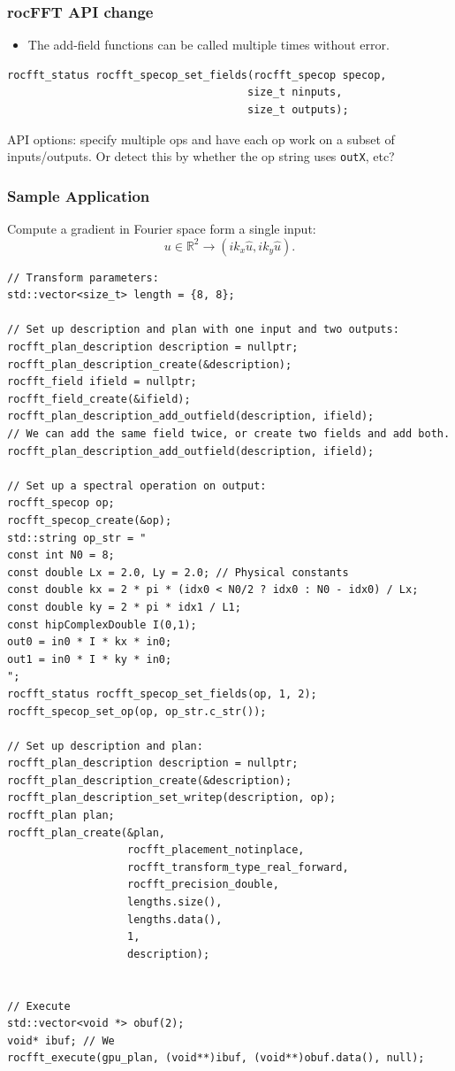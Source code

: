 \documentclass[12pt]{article}
\renewcommand{\(}{\left(}
\renewcommand{\)}{\right)}
\begin{document}
\subsubsection{rocFFT API change}
\begin{itemize}
\item The add-field functions can be called multiple times without error.
\end{itemize}
\begin{lstlisting}
rocfft_status rocfft_specop_set_fields(rocfft_specop specop,
                                      size_t ninputs,
                                      size_t outputs);
\end{lstlisting}
API options: specify multiple ops and have each op work on a subset of
inputs/outputs.  Or detect this by whether the op string uses
\lstinline{outX}, etc?


\subsubsection{Sample Application}

Compute a gradient in Fourier space form a single input:
\begin{equation}
  u \in \mathbb{R}^2 \rightarrow \(ik_x \hat{u}, ik_y \hat{u}\).
\end{equation}
\begin{lstlisting}
// Transform parameters:  
std::vector<size_t> length = {8, 8};

// Set up description and plan with one input and two outputs:
rocfft_plan_description description = nullptr;
rocfft_plan_description_create(&description);
rocfft_field ifield = nullptr;
rocfft_field_create(&ifield);
rocfft_plan_description_add_outfield(description, ifield);
// We can add the same field twice, or create two fields and add both.
rocfft_plan_description_add_outfield(description, ifield);

// Set up a spectral operation on output:
rocfft_specop op;
rocfft_specop_create(&op);
std::string op_str = "
const int N0 = 8;
const double Lx = 2.0, Ly = 2.0; // Physical constants
const double kx = 2 * pi * (idx0 < N0/2 ? idx0 : N0 - idx0) / Lx;
const double ky = 2 * pi * idx1 / L1;
const hipComplexDouble I(0,1);
out0 = in0 * I * kx * in0;
out1 = in0 * I * ky * in0;
";
rocfft_status rocfft_specop_set_fields(op, 1, 2);
rocfft_specop_set_op(op, op_str.c_str());

// Set up description and plan:
rocfft_plan_description description = nullptr;
rocfft_plan_description_create(&description);
rocfft_plan_description_set_writep(description, op);
rocfft_plan plan;
rocfft_plan_create(&plan,
                   rocfft_placement_notinplace,
                   rocfft_transform_type_real_forward,
                   rocfft_precision_double,
                   lengths.size(),
                   lengths.data(),
                   1,
                   description);


// Execute
std::vector<void *> obuf(2);
void* ibuf; // We 
rocfft_execute(gpu_plan, (void**)ibuf, (void**)obuf.data(), null);
\end{lstlisting}
\end{document}

